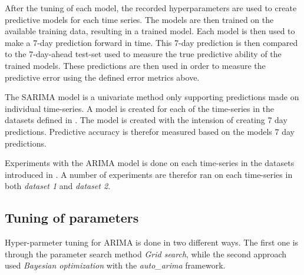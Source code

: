   After the tuning of each model, the recorded hyperparameters are used to create predictive models for each time series.
  The models are then trained on the available training data, resulting in a trained model.
  Each model is then used to make a 7-day prediction forward in time.
  This 7-day prediction is then compared to the 7-day-ahead test-set used to measure the true predictive ability of the trained models.
  These predictions are then used in order to measure the predictive error using the defined error metrics above.



\fi



\iffalse
  The SARIMA model is a univariate method only supporting predictions made on individual time-series.
  A model is created for each of the time-series in the datasets defined in .
  The model is created with the intension of creating 7 day predictions.
  Predictive accuracy is therefor measured based on the models 7 day predictions.

  Experiments with the ARIMA model is done on each time-series in the datasets introduced in .
  A number of experiments are therefor ran on each time-series in both \textit{dataset 1} and \textit{dataset 2}.


  \iffalse
    ARIMA models are first tuned on each time-series in order to make predicitons.
    The hyper-parmeters fond after the tuning is then used in order to created models capable of making predictions.
    The model attempts to make a 7 day ahead prediction.
  \fi

  \subsection{Tuning of parameters}
  Hyper-parmeter tuning for ARIMA is done in two different ways.
  The first one is through the parameter search method \textit{Grid search},
  while the second approach used \textit{Bayesian optimization} with the \textit{auto\_arima} framework.

